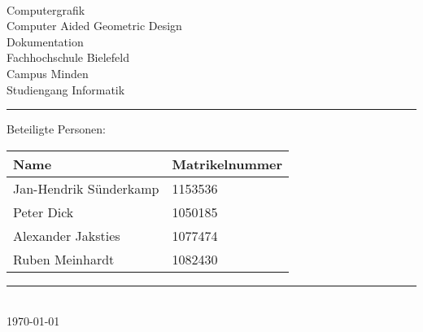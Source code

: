 \begin{titlepage}
   \mbox{}\vspace{5\baselineskip}\\
   \sffamily\huge
   \centering
   {\Huge Computergrafik} \\
   Computer Aided Geometric Design\\
    \normalsize Dokumentation
   \vspace{3\baselineskip}\\
   \rmfamily\Large
  Fachhochschule Bielefeld \\
  Campus Minden \\
  Studiengang Informatik
   \vspace{2\baselineskip}\\
\noindent\rule{15cm}{0.4pt}
Beteiligte Personen:
\begin{table}[H]
	\tablestyle
	\begin{tabular}{*{2}{v{0.45\textwidth}}}
		\hline
		\textbf{Name} & \textbf{Matrikelnummer}
		\tabularnewline
		\hline
		Jan-Hendrik Sünderkamp & 1153536\tabularnewline
		Peter Dick & 1050185\tabularnewline
		Alexander Jaksties & 1077474\tabularnewline
		Ruben Meinhardt & 1082430\tabularnewline
	\end{tabular}
\end{table}

   \noindent\rule{15cm}{0.4pt}
      \vspace{1\baselineskip}\\
   \today
\end{titlepage}

